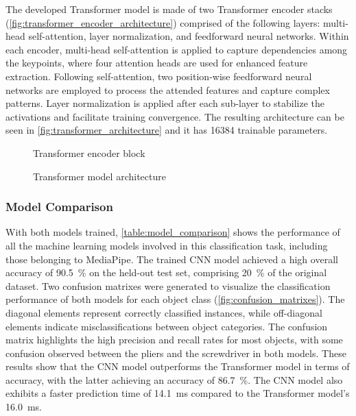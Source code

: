 
The developed Transformer model is made of two Transformer encoder stacks (\autoref{fig:transformer_encoder_architecture}) comprised of the following layers: multi-head self-attention, layer normalization, and feedforward neural networks. Within each encoder, multi-head self-attention is applied to capture dependencies among the keypoints, where four attention heads are used for enhanced feature extraction. Following self-attention, two position-wise feedforward neural networks are employed to process the attended features and capture complex patterns. Layer normalization is applied after each sub-layer to stabilize the activations and facilitate training convergence. The resulting architecture can be seen in \autoref{fig:transformer_architecture} and it has \num{16384} trainable parameters.

\begin{figure}[H] %
    \centering
    {\fontsize{10}{12}\selectfont}
    \caption{Transformer encoder block}
    \label{fig:transformer_encoder_architecture}
\end{figure}

\begin{figure}[H] %
    \centering
    {\fontsize{10}{12}\selectfont}
    \caption{Transformer model architecture}
    \label{fig:transformer_architecture}
\end{figure}

\subsubsection{Model Comparison}

With both models trained, \autoref{table:model_comparison} shows the performance of all the machine learning models involved in this classification task, including those belonging to MediaPipe. The trained CNN model achieved a high overall accuracy of \SI{90.5}{\%} on the held-out test set, comprising \SI{20}{\%} of the original dataset. Two confusion matrixes were generated to visualize the classification performance of both models for each object class (\autoref{fig:confusion_matrixes}). The diagonal elements represent correctly classified instances, while off-diagonal elements indicate misclassifications between object categories. The confusion matrix highlights the high precision and recall rates for most objects, with some confusion observed between the pliers and the screwdriver in both models. These results show that the CNN model outperforms the Transformer model in terms of accuracy, with the latter achieving an accuracy of \SI{86.7}{\%}. The CNN model also exhibits a faster prediction time of \SI{14.1}{\milli\second} compared to the Transformer model's \SI{16.0}{\milli\second}.

